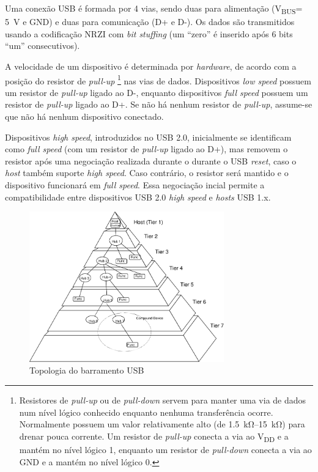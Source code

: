 \documentclass[brazil,pagestart=firstchapter]{abnt}
\newcommand{\VBUS}{V\textsubscript{BUS}\xspace}
\newcommand{\VDD}{V\textsubscript{DD}\xspace}
\newcommand{\GND}{GND\xspace}
\begin{document}
Uma conexão \ac{USB} é formada por 4 vias, sendo duas para alimentação
(\VBUS = \SI{+5}{\volt} e \GND) e duas para comunicação (D+ e D-). Os dados
são transmitidos usando a codificação \ac{NRZI} com \textit{bit stuffing}
(um ``zero'' é inserido após 6 bits ``um'' consecutivos).
\cite[p.~157]{usb20} \cite[cap.~2]{usbinanutshell}

A velocidade de um dispositivo é determinada por \textit{hardware}, de
acordo com a posição do resistor de \textit{pull-up}
	\footnote{Resistores de \textit{pull-up} ou de \textit{pull-down} servem
	para manter uma via de dados num nível lógico conhecido enquanto nenhuma
	transferência ocorre.  Normalmente possuem um valor relativamente alto
	(de \SIrange{1.5}{15}{\kilo\ohm}) para drenar pouca corrente. Um
	resistor de \textit{pull-up} conecta a via ao \VDD e a mantém no nível
	lógico 1, enquanto um resistor de \textit{pull-down} conecta a via ao
	\GND e a mantém no nível lógico 0.}
nas vias de dados. Dispositivos
\textit{low speed} possuem um resistor de \textit{pull-up} ligado ao D-,
enquanto dispositivos \textit{full speed} possuem  um resistor de
\textit{pull-up} ligado ao D+. Se não há nenhum resistor de
\textit{pull-up}, assume-se que não há nenhum dispositivo conectado.
\cite[p.~141]{usb20} \cite[cap.~2]{usbinanutshell}

Dispositivos \textit{high speed}, introduzidos no \ac{USB} 2.0, inicialmente
se identificam como \textit{full speed} (com um resistor de \textit{pull-up}
ligado ao D+), mas removem o resistor após uma negociação realizada durante
o durante o USB \textit{reset}, caso o \textit{host} também suporte
\textit{high speed}.  Caso contrário, o resistor será mantido e o
dispositivo funcionará em \textit{full speed}. Essa negociação incial
permite a compatibilidade entre dispositivos USB 2.0 \textit{high speed} e
\textit{hosts} USB 1.x. \cite[p.~142]{usb20} \cite[cap.~2]{usbinanutshell}

\begin{figure}[h]
\centering
\includegraphics[width=0.75\textwidth]{img/usb_bus_topology.pdf}
\caption{Topologia do barramento USB}
\label{fig:usb_topology}
\end{figure}
\end{document}
